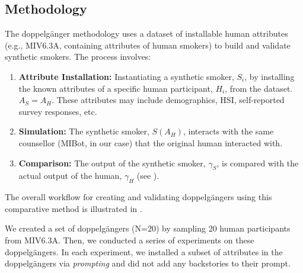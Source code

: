 \subsection{Methodology}
The doppelgänger methodology uses a dataset of installable human attributes (e.g., MIV6.3A, containing attributes of human smokers) to build and validate synthetic smokers. The process involves:

\begin{enumerate}
	\item \textbf{Attribute Installation:} Instantiating a synthetic smoker, $S_i$, by installing the known attributes of a specific human participant, $H_i$, from the dataset. $A_S = A_H$. These attributes may include demographics, HSI, self-reported survey responses, etc.
	\item \textbf{Simulation:} The synthetic smoker, $S(A_H)$, interacts with the same counsellor (MIBot, in our case) that the original human interacted with.
	\item \textbf{Comparison:} The output of the synthetic smoker, $\gamma_S$, is compared with the actual output of the human, $\gamma_H$ (see ).
\end{enumerate}



The overall workflow for creating and validating doppelgängers using this comparative method is illustrated in .



We created a set of doppelgängers (N=20) by sampling 20 human participants from MIV6.3A. Then, we conducted a series of experiments on these doppelgängers. In each experiment, we installed a subset of attributes in the doppelgängers via \emph{prompting} and did not add any backstories to their prompt.




